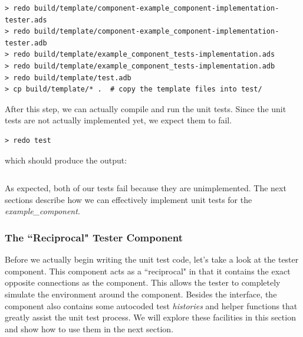 \vspace{5mm} %
\begin{verbatim}
> redo build/template/component-example_component-implementation-tester.ads
> redo build/template/component-example_component-implementation-tester.adb
> redo build/template/example_component_tests-implementation.ads
> redo build/template/example_component_tests-implementation.adb
> redo build/template/test.adb
> cp build/template/* .  # copy the template files into test/
\end{verbatim}
\vspace{5mm} %

After this step, we can actually compile and run the unit tests. Since the unit tests are not actually implemented yet, we expect them to fail.

\vspace{5mm} %
\begin{verbatim}
> redo test
\end{verbatim}
\vspace{5mm} %

which should produce the output:

\vspace{5mm} %
\inputminted{text}{../example_architecture/example_component/test/output.txt}
\vspace{5mm} %

As expected, both of our tests fail because they are unimplemented. The next sections describe how we can effectively implement unit tests for the \textit{example\_component}.

\subsubsection{The ``Reciprocal" Tester Component}

Before we actually begin writing the unit test code, let's take a look at the tester component. This component acts as a ``reciprocal" in that it contains the exact opposite connections as the component. This allows the tester to completely simulate the environment around the component. Besides the interface, the component also contains some autocoded test \textit{histories} and helper functions that greatly assist the unit test process. We will explore these facilities in this section and show how to use them in the next section. \\

